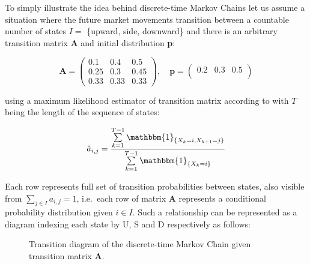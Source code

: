 To simply illustrate the idea behind discrete-time Markov Chains let us assume a situation where the future market movements transition between a countable number of states $I =$ \{upward, side, downward\} 
and there is an arbitrary transition matrix \textbf{A} and initial distribution \textbf{p}:

\begin{equation}
    \textbf{A} =
\begin{pmatrix}
0.1 & 0.4 & 0.5 \\
0.25 & 0.3 & 0.45 \\
0.33 & 0.33 & 0.33 
\end{pmatrix} 
, \quad \textbf{p} = 
\begin{pmatrix}
    0.2 & 0.3 & 0.5 \\
\end{pmatrix}
\end{equation}

using a maximum likelihood estimator of transition matrix according to \citep{Gagniuc2017} with $T$ being the length of the sequence of states:

\begin{equation}
    \hat{a}_{i,j} = \frac{\sum\limits_{k=1}^{T-1} \mathbbm{1}_{\{X_k=i,X_{k+1}=j\}}}{\sum\limits_{k=1}^{T-1} \mathbbm{1}_{\{X_k=i\}}}
\end{equation}

Each row represents full set of transition probabilities between states, also visible from $\sum\limits_{j \in I} a_{i,j} = 1 $, i.e.\ each row of matrix $\textbf{A}$ represents a conditional probability distribution given $i \in I$. 
Such a relationship can be represented as a diagram indexing each state by U, S and D respectively as follows:

\begin{figure}[htbp]
\begin{center}
\caption[Visual representation of discrere-time Markov Chain]{Transition diagram of the discrete-time Markov Chain given transition matrix \textbf{A}.}
\end{center}
\end{figure}

